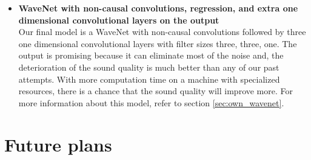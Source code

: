 \documentclass{article}
\begin{document}
\begin{itemize}
	\item \textbf{WaveNet with non-causal convolutions, regression, and extra one dimensional convolutional layers on the output} \\
	Our final model is a WaveNet with non-causal convolutions followed by three one dimensional convolutional layers with filter sizes three, three, one. The output is promising because it can eliminate most of the noise and, the deterioration of the sound quality is much better than any of our past attempts. With more computation time on a machine with specialized resources, there is a chance that the sound quality will improve more. For more information about this model, refer to section \ref{sec:own_wavenet}.
	
	\end{itemize}



	
	
	\section{Future plans}
	\label{sec:experiments}
	
	\newpage
	\printbibliography
\end{document}
